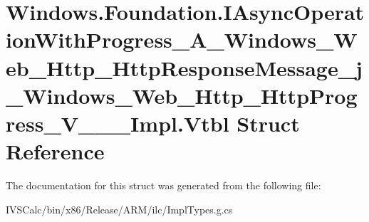 \hypertarget{struct_windows_1_1_foundation_1_1_i_async_operation_with_progress___a___windows___web___http___h5a0f74f6937700a36acca27f5dd1e2e4}{}\section{Windows.\+Foundation.\+I\+Async\+Operation\+With\+Progress\+\_\+\+A\+\_\+\+Windows\+\_\+\+Web\+\_\+\+Http\+\_\+\+Http\+Response\+Message\+\_\+j\+\_\+\+Windows\+\_\+\+Web\+\_\+\+Http\+\_\+\+Http\+Progress\+\_\+\+V\+\_\+\+\_\+\+\_\+\+Impl.\+Vtbl Struct Reference}
\label{struct_windows_1_1_foundation_1_1_i_async_operation_with_progress___a___windows___web___http___h5a0f74f6937700a36acca27f5dd1e2e4}


The documentation for this struct was generated from the following file\+:\begin{DoxyCompactItemize}
\item 
I\+V\+S\+Calc/bin/x86/\+Release/\+A\+R\+M/ilc/Impl\+Types.\+g.\+cs\end{DoxyCompactItemize}
